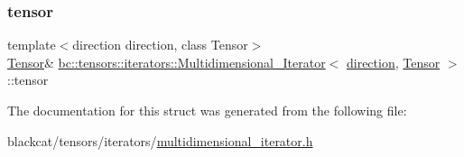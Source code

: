 \mbox{\label{structbc_1_1tensors_1_1iterators_1_1Multidimensional__Iterator_ab8b259469874b4ed8e9abfa5d293603e}} 
\subsubsection{\texorpdfstring{tensor}{tensor}}
{\footnotesize\ttfamily template$<$direction direction, class Tensor$>$ \\
\hyperlink{namespacebc_a659391e47ab612be3ba6c18cf9c89159}{Tensor}\& \hyperlink{structbc_1_1tensors_1_1iterators_1_1Multidimensional__Iterator}{bc\+::tensors\+::iterators\+::\+Multidimensional\+\_\+\+Iterator}$<$ \hyperlink{namespacebc_1_1tensors_1_1iterators_ae76efe63fb9cb4985d5e4e6af0ebf296}{direction}, \hyperlink{namespacebc_a659391e47ab612be3ba6c18cf9c89159}{Tensor} $>$\+::tensor}



The documentation for this struct was generated from the following file\+:\begin{DoxyCompactItemize}
\item 
blackcat/tensors/iterators/\hyperlink{multidimensional__iterator_8h}{multidimensional\+\_\+iterator.\+h}\end{DoxyCompactItemize}
